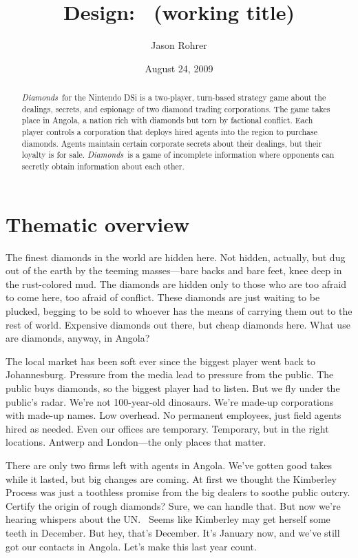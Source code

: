 \documentclass[8pt]{extarticle}
\title{Design: \gtitle\ (working title)}
\author{Jason Rohrer}
\date{August 24, 2009}
\newcommand{\gtitle}{{\it Diamonds}}
\begin{document}
\maketitle

\renewcommand{\abstractnamefont}{\normalfont\bfseries}
\renewcommand{\abstracttextfont}{\normalfont}

\begin{abstract}
\gtitle\ for the Nintendo DSi is a two-player, turn-based strategy game about the dealings, secrets, and espionage of two diamond trading corporations.  The game takes place in Angola, a nation rich with diamonds but torn by factional conflict.  Each player controls a corporation that deploys hired agents into the region to purchase diamonds.  Agents maintain certain corporate secrets about their dealings, but their loyalty is for sale.  \gtitle\ is a game of incomplete information where opponents can secretly obtain information about each other.  
\end{abstract}


\section{Thematic overview}

The finest diamonds in the world are hidden here.  Not hidden, actually, but dug out of the earth by the teeming masses---bare backs and bare feet, knee deep in the rust-colored mud.  The diamonds are hidden only to those who are too afraid to come here, too afraid of conflict.  These diamonds are just waiting to be plucked, begging to be sold to whoever has the means of carrying them out to the rest of world.  Expensive diamonds out there, but cheap diamonds here.  What use are diamonds, anyway, in Angola?

The local market has been soft ever since the biggest player went back to Johannesburg.   Pressure from the media lead to pressure from the public.  The public buys diamonds, so the biggest player had to listen.  But we fly under the public's radar.  We're not 100-year-old dinosaurs.  We're made-up corporations with made-up names.  Low overhead.  No permanent employees, just field agents hired as needed.  Even our offices are temporary.  Temporary, but in the right locations.  Antwerp and London---the only places that matter.

There are only two firms left with agents in Angola.  We've gotten good takes while it lasted, but big changes are coming.  At first we thought the Kimberley Process was just a toothless promise from the big dealers to soothe public outcry.  Certify the origin of rough diamonds?  Sure, we can handle that.  But now we're hearing whispers about the UN. \ Seems like Kimberley may get herself some teeth in December.  But hey, that's December.  It's January now, and we've still got our contacts in Angola.  Let's make this last year count.
\end{document}
